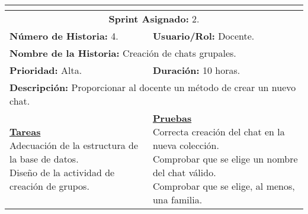 \resizebox{15cm}{!} {
	\begin{tabular}{|l|l|}
		\hline
		\multicolumn{2}{|c|}{\cellcolor[HTML]{343434}{\color[HTML]{FFFFFF} \textbf{Historia de Usuario}}} \\
		\hline
		\multicolumn{2}{|c|}{\textbf{Sprint Asignado:} 2.} \\
		\hline
		\textbf{Número de Historia:} 4. & \textbf{Usuario/Rol:} Docente.\\
		\hline
		\multicolumn{2}{|l|}{\textbf{Nombre de la Historia:} Creación de chats grupales.} \\
		\hline
		\textbf{Prioridad:} Alta. & \textbf{Duración:} 10 horas.\\
		\hline
		\multicolumn{2}{|l|}{\textbf{Descripción:} Proporcionar al docente un método de crear un nuevo chat.} \\
		\hline
		\specialcell{\underline{\textbf{Tareas}} \\ Adecuación de la estructura de la base de datos. \\ Diseño de la actividad de creación de grupos.} & \specialcell{\underline{\textbf{Pruebas}} \\ Correcta creación del chat en la nueva colección. \\ Comprobar que se elige un nombre del chat válido. \\ Comprobar que se elige, al menos, una familia.} \\
		\hline
	\end{tabular}
}

